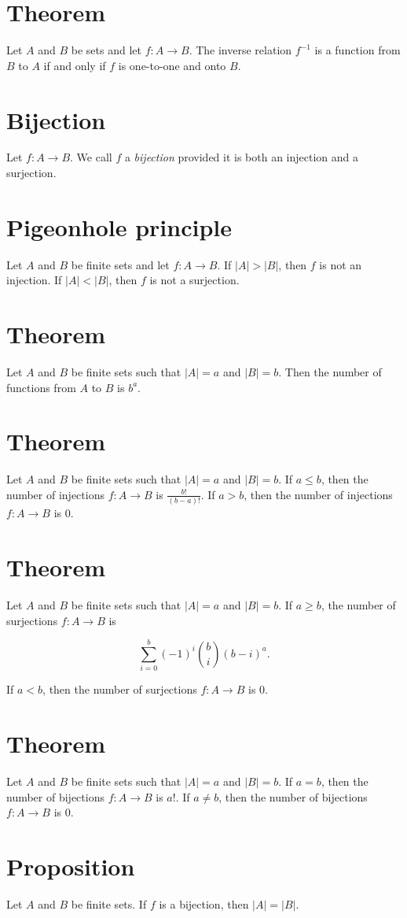 \documentclass[12pt]{article}
\begin{document}
\section*{Theorem}
Let $A$ and $B$ be sets and let $f:A\to B$. The inverse relation $f^{-1}$ is a function from $B$ to $A$ if and only if $f$ is one-to-one and onto $B$.
\section*{Bijection}
Let $f:A\to B$. We call $f$ a \textit{bijection} provided it is both an injection and a surjection.
\section*{Pigeonhole principle}
Let $A$ and $B$ be finite sets and let $f:A\to B$. If $|A|>|B|$, then $f$ is not an injection. If $|A|<|B|$, then $f$ is not a surjection.
\section*{Theorem}
Let $A$ and $B$ be finite sets such that $|A|=a$ and $|B|=b$. Then the number of functions from $A$ to $B$ is $b^a$.
\section*{Theorem}
Let $A$ and $B$ be finite sets such that $|A|=a$ and $|B|=b$. If $a\leq b$, then the number of injections $f:A\to B$ is $\frac{b!}{(b-a)!}$. If $a>b$, then the number of injections $f:A\to B$ is 0.
\section*{Theorem}
Let $A$ and $B$ be finite sets such that $|A|=a$ and $|B|=b$. If $a\geq b$, the number of surjections $f:A\to B$ is

\[\sum_{i=0}^{b}{(-1)^i\binom{b}{i}(b-i)^a}.\]

If $a<b$, then the number of surjections $f:A\to B$ is 0.
\section*{Theorem}
Let $A$ and $B$ be finite sets such that $|A|=a$ and $|B|=b$. If $a=b$, then the number of bijections $f:A\to B$ is $a!$. If $a\neq b$, then the number of bijections $f:A\to B$ is 0.
\section*{Proposition}
Let $A$ and $B$ be finite sets. If $f$ is a bijection, then $|A|=|B|$. 
\end{document}
